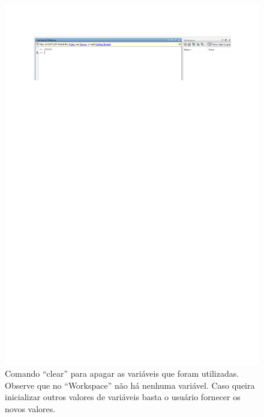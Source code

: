 \documentclass[10pt]{article}
\begin{document}
\begin{figure}[H]
    \centering
    \includegraphics[scale = 0.7]{fig9teste.pdf}
    \caption{Comando ``clear'' para apagar as variáveis que foram utilizadas. Observe que no ``Workspace'' não há nenhuma variável. Caso queira inicializar outros valores de variáveis basta o usuário fornecer os novos valores.}
\end{figure}
\end{document}
